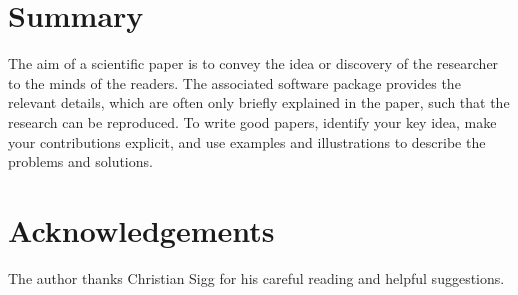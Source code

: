 \documentclass[10pt,conference,compsocconf]{IEEEtran}
\begin{document}
	
	
	\section{Summary}
	
	The aim of a scientific paper is to convey the idea or discovery of
	the researcher to the minds of the readers. The associated software
	package provides the relevant details, which are often only briefly
	explained in the paper, such that the research can be reproduced.
	To write good papers, identify your key idea, make your contributions
	explicit, and use examples and illustrations to describe the problems
	and solutions.
	
	\section*{Acknowledgements}
	The author thanks Christian Sigg for his careful reading and helpful
	suggestions.
	
	
	
	
\end{document}
